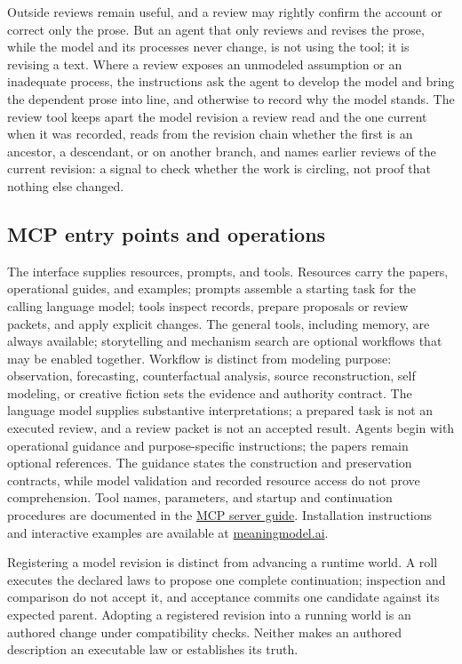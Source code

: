 \documentclass[11pt,a4paper]{article}
\begin{document}
Outside reviews remain useful, and a review may rightly confirm the
account or correct only the prose. But an agent that only reviews and revises
the prose, while the model and its processes never change, is not using the
tool; it is revising a text. Where a review exposes an unmodeled assumption or
an inadequate process, the instructions ask the agent to develop the model and
bring the dependent prose into line, and otherwise to record why the model
stands. The review tool keeps apart the model revision a review read and the one
current when it was recorded, reads from the revision chain whether the first is
an ancestor, a descendant, or on another branch, and names earlier reviews of the
current revision:
a signal to check whether the work is circling, not proof that nothing else
changed.



\subsection{MCP entry points and operations}

The interface supplies resources, prompts, and tools. Resources carry the papers,
operational guides, and examples; prompts assemble a starting task for the
calling language model; tools inspect records, prepare proposals or review
packets, and apply explicit changes. The general tools, including memory, are
always available;
storytelling and mechanism search are optional workflows that may be enabled
together. Workflow is distinct from modeling purpose: observation, forecasting,
counterfactual analysis, source reconstruction, self modeling, or creative
fiction sets the evidence and authority contract. The language model supplies
substantive interpretations; a prepared task is not an executed review, and a
review packet is not an accepted result. Agents begin with operational guidance and purpose-specific instructions;
the papers remain optional references. The guidance states the construction and
preservation contracts, while model validation and recorded resource access
do not prove comprehension. Tool names, parameters, and startup and continuation
procedures are documented in the
\href{https://github.com/emergent-wisdom/meaning-model/blob/main/mcp-server/README.md}{MCP server guide}.
Installation instructions and interactive examples are available at
\href{https://meaningmodel.ai/}{meaningmodel.ai}.

Registering a model revision is distinct from advancing a runtime world. A roll
executes the declared laws to propose one complete continuation; inspection and
comparison do not accept it, and acceptance commits one candidate against its
expected parent. Adopting a registered revision into a running world is an
authored change under compatibility checks. Neither makes an authored
description an executable law or establishes its truth.
\end{document}
